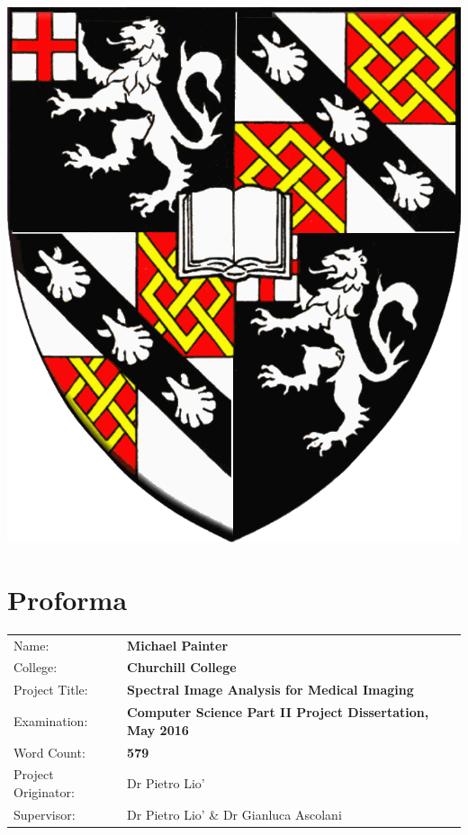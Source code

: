 \documentclass[12pt,twoside,notitlepage]{report}
\begin{document}
\begin{center}
    \includegraphics[scale=0.2792]{titleimg/chucrest}

    \vfill
\end{center}

\cleardoublepage






\setcounter{page}{1}
\pagestyle{plain}

\chapter*{Proforma}

{\large
\begin{tabularx}{\textwidth}{l X}
Name:               & \bf Michael Painter                      \\
College:            & \bf Churchill College                     \\
Project Title:      & \bf Spectral Image Analysis for Medical Imaging \\
Examination:        & \bf Computer Science Part II Project Dissertation, May 2016        \\
Word Count:         & \bf 579\footnotemark[1]\\
Project Originator: & Dr Pietro Lio'              \\
Supervisor:         & Dr Pietro Lio' \& Dr Gianluca Ascolani       \\ 
\end{tabularx}
}
\end{document}
